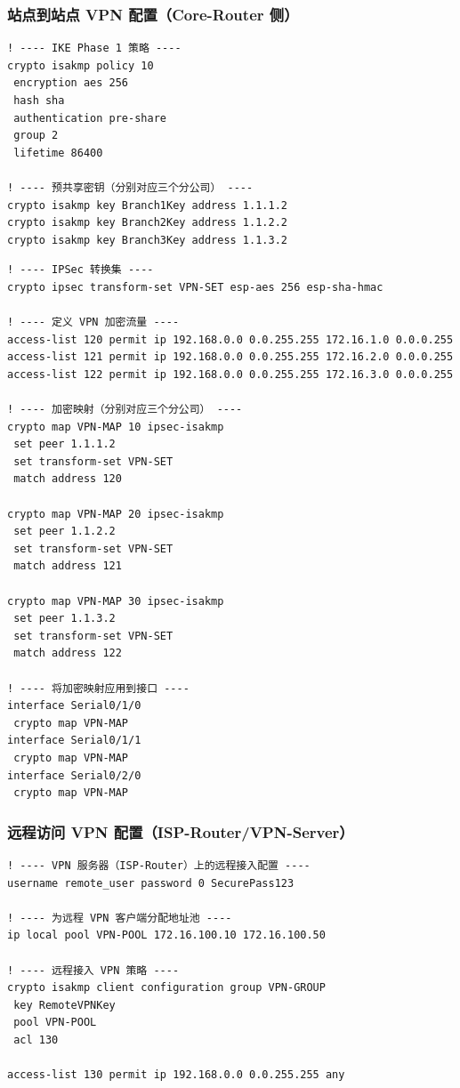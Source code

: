 \documentclass[12pt,a4paper]{ctexart}
\begin{document}
\subsubsection{站点到站点 VPN 配置（Core-Router 侧）}

\begin{lstlisting}[caption={IPSec VPN Phase 1 — IKE/ISAKMP 策略}, label={lst:vpn-ike}]
! ---- IKE Phase 1 策略 ----
crypto isakmp policy 10
 encryption aes 256
 hash sha
 authentication pre-share
 group 2
 lifetime 86400

! ---- 预共享密钥（分别对应三个分公司） ----
crypto isakmp key Branch1Key address 1.1.1.2
crypto isakmp key Branch2Key address 1.1.2.2
crypto isakmp key Branch3Key address 1.1.3.2
\end{lstlisting}

\begin{lstlisting}[caption={IPSec VPN Phase 2 — 转换集与加密映射}, label={lst:vpn-ipsec}]
! ---- IPSec 转换集 ----
crypto ipsec transform-set VPN-SET esp-aes 256 esp-sha-hmac

! ---- 定义 VPN 加密流量 ----
access-list 120 permit ip 192.168.0.0 0.0.255.255 172.16.1.0 0.0.0.255
access-list 121 permit ip 192.168.0.0 0.0.255.255 172.16.2.0 0.0.0.255
access-list 122 permit ip 192.168.0.0 0.0.255.255 172.16.3.0 0.0.0.255

! ---- 加密映射（分别对应三个分公司） ----
crypto map VPN-MAP 10 ipsec-isakmp
 set peer 1.1.1.2
 set transform-set VPN-SET
 match address 120

crypto map VPN-MAP 20 ipsec-isakmp
 set peer 1.1.2.2
 set transform-set VPN-SET
 match address 121

crypto map VPN-MAP 30 ipsec-isakmp
 set peer 1.1.3.2
 set transform-set VPN-SET
 match address 122

! ---- 将加密映射应用到接口 ----
interface Serial0/1/0
 crypto map VPN-MAP
interface Serial0/1/1
 crypto map VPN-MAP
interface Serial0/2/0
 crypto map VPN-MAP
\end{lstlisting}

\subsubsection{远程访问 VPN 配置（ISP-Router/VPN-Server）}

\begin{lstlisting}[caption={远程访问 VPN 配置}, label={lst:vpn-remote}]
! ---- VPN 服务器（ISP-Router）上的远程接入配置 ----
username remote_user password 0 SecurePass123

! ---- 为远程 VPN 客户端分配地址池 ----
ip local pool VPN-POOL 172.16.100.10 172.16.100.50

! ---- 远程接入 VPN 策略 ----
crypto isakmp client configuration group VPN-GROUP
 key RemoteVPNKey
 pool VPN-POOL
 acl 130

access-list 130 permit ip 192.168.0.0 0.0.255.255 any
\end{lstlisting}
\end{document}
